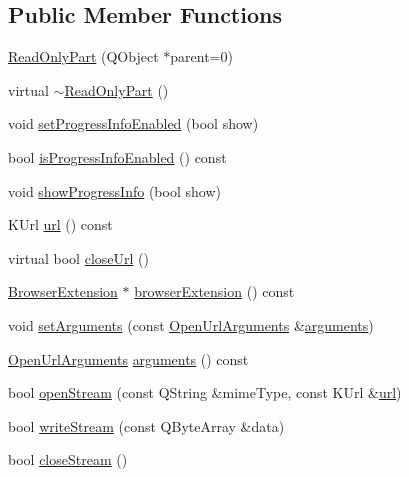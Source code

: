 \subsection*{Public Member Functions}
\begin{DoxyCompactItemize}
\item 
\hyperlink{classKParts_1_1ReadOnlyPart_ad8b7c3b0f0bc8303dc66c79d8ebc57e9}{Read\+Only\+Part} (Q\+Object $\ast$parent=0)
\item 
virtual \hyperlink{classKParts_1_1ReadOnlyPart_a8609199ca6addc35abf7f78b02e3236c}{$\sim$\+Read\+Only\+Part} ()
\item 
void \hyperlink{classKParts_1_1ReadOnlyPart_a95a547b488bc688035cffbd3df6f0b27}{set\+Progress\+Info\+Enabled} (bool show)
\item 
bool \hyperlink{classKParts_1_1ReadOnlyPart_aa1cff9c4698b9631d5bdd9f912f91568}{is\+Progress\+Info\+Enabled} () const 
\item 
void \hyperlink{classKParts_1_1ReadOnlyPart_ab3e6bd5d262b6b0b26acc003b2957c0b}{show\+Progress\+Info} (bool show)
\item 
K\+Url \hyperlink{classKParts_1_1ReadOnlyPart_aba05c3b2fd42dcfebc6585e4f746d2cb}{url} () const 
\item 
virtual bool \hyperlink{classKParts_1_1ReadOnlyPart_a1df069c3c0503f529dc9f0d7007f144d}{close\+Url} ()
\item 
\hyperlink{classKParts_1_1BrowserExtension}{Browser\+Extension} $\ast$ \hyperlink{classKParts_1_1ReadOnlyPart_a58d61ab4d2b2ed8d7944e1b02dbba0e2}{browser\+Extension} () const 
\item 
void \hyperlink{classKParts_1_1ReadOnlyPart_aab893a47747cad8bb29f1f95316140de}{set\+Arguments} (const \hyperlink{classKParts_1_1OpenUrlArguments}{Open\+Url\+Arguments} \&\hyperlink{classKParts_1_1ReadOnlyPart_a811e25200521dcf347bacb6be7ab8ecf}{arguments})
\item 
\hyperlink{classKParts_1_1OpenUrlArguments}{Open\+Url\+Arguments} \hyperlink{classKParts_1_1ReadOnlyPart_a811e25200521dcf347bacb6be7ab8ecf}{arguments} () const 
\item 
bool \hyperlink{classKParts_1_1ReadOnlyPart_aa3dacdfd6412d40f62ed75b02058b5e4}{open\+Stream} (const Q\+String \&mime\+Type, const K\+Url \&\hyperlink{classKParts_1_1ReadOnlyPart_a5b8edbf05a338814287496882adde559}{url})
\item 
bool \hyperlink{classKParts_1_1ReadOnlyPart_a5e6aac81ead43987e1711207b00878db}{write\+Stream} (const Q\+Byte\+Array \&data)
\item 
bool \hyperlink{classKParts_1_1ReadOnlyPart_a7af5ff9f593ee75dac30498ebf87c255}{close\+Stream} ()
\end{DoxyCompactItemize}
